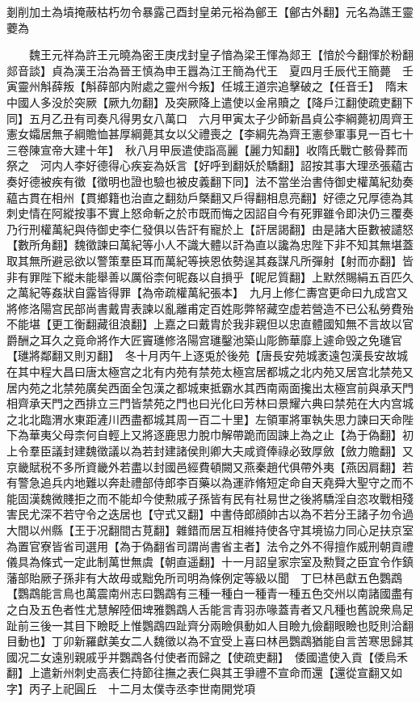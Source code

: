 剗削加土為墳掩蔽枯朽勿令暴露己酉封皇弟元裕為鄶王【鄶古外翻】元名為譙王靈蘷為

　　魏王元祥為許王元曉為密王庚戌封皇子愔為梁王惲為郯王【愔於今翻惲於粉翻郯音談】貞為漢王治為晉王慎為申王囂為江王簡為代王　夏四月壬辰代王簡薨　壬寅靈州斛薛叛【斛薛部内附處之靈州今叛】任城王道宗追擊破之【任音壬】　隋末中國人多没於突厥【厥九勿翻】及突厥降上遣使以金帛贖之【降戶江翻使疏吏翻下同】五月乙丑有司奏凡得男女八萬口　六月甲寅太子少師新昌貞公李綱薨初周齊王憲女孀居無子綱贍恤甚厚綱薨其女以父禮喪之【李綱先為齊王憲參軍事見一百七十三卷陳宣帝大建十年】　秋八月甲辰遣使詣高麗【麗力知翻】收隋氏戰亡骸骨葬而祭之　河内人李好德得心疾妄為妖言【好呼到翻妖於驕翻】詔按其事大理丞張藴古奏好德被疾有徵【徵明也證也驗也被皮義翻下同】法不當坐治書侍御史權萬紀劾奏藴古貫在相州【貫鄉籍也治直之翻劾戶槩翻又戶得翻相息亮翻】好德之兄厚德為其刺史情在阿縱按事不實上怒命斬之於市既而悔之因詔自今有死罪雖令即決仍三覆奏乃行刑權萬紀與侍御史李仁發俱以告訐有寵於上【訐居謁翻】由是諸大臣數被譴怒【數所角翻】魏徵諫曰萬紀等小人不識大體以訐為直以讒為忠陛下非不知其無堪蓋取其無所避忌欲以警策羣臣耳而萬紀等挾恩依勢逞其姦謀凡所彈射【射而亦翻】皆非有罪陛下縱未能舉善以厲俗柰何昵姦以自損乎【昵尼質翻】上默然賜絹五百匹久之萬紀等姦狀自露皆得罪【為帝疏權萬紀張本】　九月上修仁夀宫更命曰九成宫又將修洛陽宫民部尚書戴胄表諫以亂離甫定百姓彫弊帑藏空虚若營造不已公私勞費殆不能堪【更工衡翻藏徂浪翻】上嘉之曰戴胄於我非親但以忠直體國知無不言故以官爵酬之耳久之竟命將作大匠竇璡修洛陽宫璡鑿池築山彫飾華靡上遽命毁之免璡官【璡將鄰翻又則刃翻】　冬十月丙午上逐兎於後苑【唐長安苑城袤遠包漢長安故城在其中程大昌曰唐太極宫之北有内苑有禁苑太極宫居都城之北内苑又居宫北禁苑又居内苑之北禁苑廣矣西面全包漢之都城東抵霸水其西南兩面攙出太極宫前與承天門相齊承天門之西排立三門皆禁苑之門也曰光化曰芳林曰景耀六典曰禁苑在大内宫城之北北臨渭水東距滻川西盡都城其周一百二十里】左領軍將軍執失思力諫曰天命陛下為華夷父母柰何自輕上又將逐鹿思力脫巾解帶跪而固諫上為之止【為于偽翻】初上令羣臣議封建魏徵議以為若封建諸侯則卿大夫咸資俸祿必致厚斂【斂力贍翻】又京畿賦税不多所資畿外若盡以封國邑經費頓闕又燕秦趙代俱帶外夷【燕因肩翻】若有警急追兵内地難以奔赴禮部侍郎李百藥以為運祚脩短定命自天堯舜大聖守之而不能固漢魏微賤拒之而不能却今使勲戚子孫皆有民有社易世之後將驕淫自恣攻戰相殘害民尤深不若守令之迭居也【守式又翻】中書侍郎顔帥古以為不若分王諸子勿令過大間以州縣【王于况翻間古莧翻】雜錯而居互相維持使各守其境協力同心足扶京室為置官寮皆省司選用【為于偽翻省司謂尚書省主者】法令之外不得擅作威刑朝貢禮儀具為條式一定此制萬世無虞【朝直遥翻】十一月詔皇家宗室及勲賢之臣宜令作鎮藩部貽厥子孫非有大故毋或黜免所司明為條例定等級以聞　丁巳林邑獻五色鸚鵡【鸚鵡能言鳥也萬震南州志曰鸚鵡有三種一種白一種青一種五色交州以南諸國盡有之白及五色者性尤慧解陸佃埤雅鸚鵡人舌能言青羽赤喙蓋青者又凡種也舊說衆鳥足趾前三後一其目下瞼眨上惟鸚鵡四趾齊分兩瞼俱動如人目瞼九儉翻眼瞼也貶則洽翻目動也】丁卯新羅獻美女二人魏徵以為不宜受上喜曰林邑鸚鵡猶能自言苦寒思歸其國况二女遠别親戚乎并鸚鵡各付使者而歸之【使疏吏翻】　倭國遣使入貢【倭烏禾翻】上遣新州刺史高表仁持節往撫之表仁與其王爭禮不宣命而還【還從宣翻又如字】丙子上祀圓丘　十二月太僕寺丞李世南開党項

